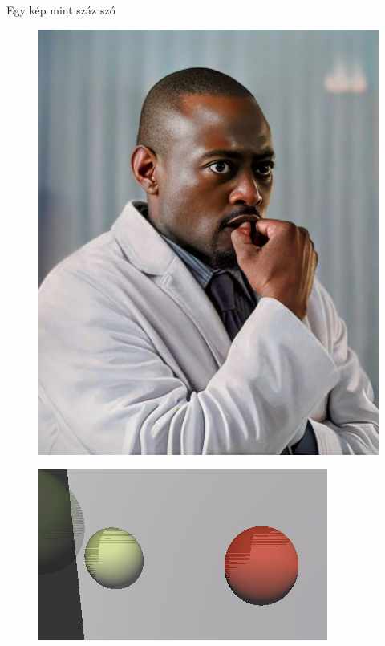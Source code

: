 \documentclass{beamer}
\begin{document}
\begin{frame}{Egy kép mint száz szó}
	\begin{figure}[ht]
		\begin{minipage}[b]{0.45\linewidth}
			\centering
			\includegraphics[width=\textwidth]{vex.png}%
		\end{minipage}
		\hspace*{0.5cm}
		\begin{minipage}[b]{0.45\linewidth}
			\centering
			\includegraphics[width=\textwidth]{tigerprint.png}%
			\label{img:tigerprint}
		\end{minipage}
	\end{figure}
\end{frame}
\end{document}
